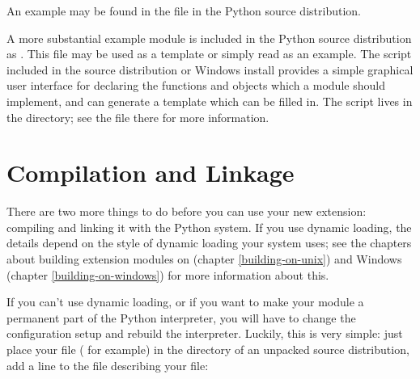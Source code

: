 An example may be found in the file  in the
Python source distribution.


A more substantial example module is included in the Python source
distribution as .  This file may be used as a 
template or simply read as an example.  The 
script included in the source distribution or Windows install provides 
a simple graphical user interface for declaring the functions and
objects which a module should implement, and can generate a template
which can be filled in.  The script lives in the
 directory; see the  file there
for more information.


\section{Compilation and Linkage
         \label{compilation}}

There are two more things to do before you can use your new extension:
compiling and linking it with the Python system.  If you use dynamic
loading, the details depend on the style of dynamic loading your
system uses; see the chapters about building extension modules on
\UNIX{} (chapter \ref{building-on-unix}) and Windows (chapter
\ref{building-on-windows}) for more information about this.

If you can't use dynamic loading, or if you want to make your module a
permanent part of the Python interpreter, you will have to change the
configuration setup and rebuild the interpreter.  Luckily, this is
very simple: just place your file ( for example) in
the  directory of an unpacked source distribution, add
a line to the file  describing your file:

